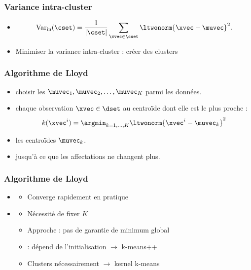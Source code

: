\begin{frame}
  \frametitle{Variance intra-cluster}
  \begin{itemize}
  \item {}
    \[
            \text{Var}_\text{in}(\cset) = \frac1{\lvert \cset \rvert} \sum_{\xvec \in \cset}
      \ltwonorm{\xvec - \muvec}^2.
    \]
  \item Minimiser la variance intra-cluster : créer des clusters 
  \end{itemize}
\end{frame}

\begin{frame}
  \frametitle{Algorithme de Lloyd}
  \begin{itemize}
  \item {} choisir les $\muvec_1, \muvec_2, \ldots, \muvec_K$ parmi les données. 
  \item {} chaque observation $\xvec \in \dset$ au centroïde dont elle est le plus proche :
    \begin{equation*}
      k(\xvec^i) = \argmin_{k=1, \ldots, K}\ltwonorm{\xvec^i - \muvec_k}^2
    \end{equation*}
  \item {} les centroïdes $\muvec_k$. 
  \item {} jusqu'à ce que les affectations ne changent plus. 
  \end{itemize}
\end{frame}

\begin{frame}
  \frametitle{Algorithme de Lloyd}
  \begin{itemize}
  \item {}
    \begin{itemize}
    \item Converge rapidement en pratique
    \end{itemize}
    \pause
  \item {}
    \begin{itemize}
    \item Nécessité de fixer $K$ 
    \item Approche  : pas de garantie de minimum global
    \item {} : dépend de l'initialisation \pause $\rightarrow$ k-means++ 
    \item Clusters nécessairement  \pause $\rightarrow$ kernel k-means
    \end{itemize}
  \end{itemize}
\end{frame}

